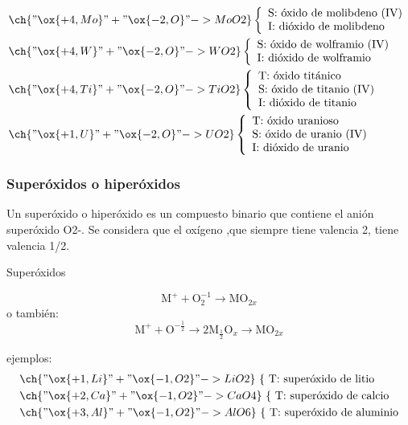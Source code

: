 \begin{align*}
	&\ch{"\ox{+4,Mo}" + "\ox{-2,O}" -> MoO2}\left\{\begin{array}{l}
		\text{S: óxido de molibdeno (IV)}\\
		\text{I: dióxido de molibdeno}
	\end{array}\right.\\
	&\ch{"\ox{+4,W}" + "\ox{-2,O}" -> WO2}\left\{\begin{array}{l}
		\text{S: óxido de wolframio (IV)}\\
		\text{I: dióxido de wolframio}
	\end{array}\right.\\
	&\ch{"\ox{+4,Ti}" + "\ox{-2,O}" -> TiO2}\left\{\begin{array}{l}
		\text{T: óxido titánico}\\
		\text{S: óxido de titanio (IV)}\\
		\text{I: dióxido de titanio}
	\end{array}\right.\\
	&\ch{"\ox{+1,U}" + "\ox{-2,O}" -> UO2}\left\{\begin{array}{l}
		\text{T: óxido uranioso}\\
		\text{S: óxido de uranio (IV)}\\
		\text{I: dióxido de uranio}
	\end{array}\right.\\
\end{align*}
\subsubsection*{Superóxidos o hiperóxidos}
Un superóxido o hiperóxido es un compuesto binario que contiene el anión superóxido O2-. Se considera que el oxígeno ,que siempre tiene valencia 2, tiene valencia 1/2.
\begin{Theorem*} {Superóxidos}
	\begin{figure}[H]
		\centering
	\end{figure}
	$$\mathrm{M}^{+} + \mathrm{O}^{-1}_2 \rightarrow\mathrm{M}\mathrm{O}_{2x} $$
	o también:
	$$\mathrm{M}^{+} + \mathrm{O}^{-\frac{1}{2}} \rightarrow2\mathrm{M}_{\frac{1}{2}}\mathrm{O}_x\rightarrow\mathrm{M}\mathrm{O}_{2x} $$
\end{Theorem*}
\noindent ejemplos:
\begin{align*}
	&\ch{"\ox{+1,Li}" + "\ox{-1,O2}" -> LiO2} \ \text{\{ T: superóxido de litio}\\
	&\ch{"\ox{+2,Ca}" + "\ox{-1,O2}" -> CaO4} \ \text{\{ T: superóxido de calcio}\\
	&\ch{"\ox{+3,Al}" + "\ox{-1,O2}" -> AlO6} \ \text{\{ T: superóxido de aluminio}
\end{align*}
